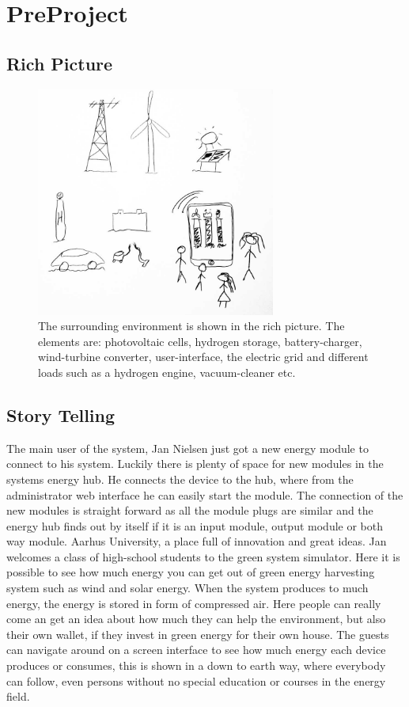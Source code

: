 \chapter{PreProject}
\section{Rich Picture}

\begin{figure}[H]
 \begin{centering}
  \includegraphics[width=0.7\textwidth]{images/rich_picture1.png}
   \caption{The surrounding environment is shown in the rich picture. The
 			 elements are: photovoltaic cells, hydrogen storage, battery-charger, wind-turbine
 			 converter, user-interface, the electric grid and different loads such as a
 			 hydrogen engine, vacuum-cleaner etc. }
 \end{centering}
\end{figure}

\section{Story Telling}
The main user of the system, Jan Nielsen just got a new energy module to connect to his system. Luckily there is plenty of space
for new modules in the systems energy hub. He connects the device to the hub, where from the administrator web interface he can easily start the module.
The connection of the new modules is straight forward as all the module plugs are similar and the energy hub finds out by itself
if it is an input module, output module or both way module.
\newline
Aarhus University, a place full of innovation and great ideas. Jan welcomes a class of high-school students to the green system simulator. Here it
is possible to see how much energy you can get out of green energy harvesting system
such as wind and solar energy. When the system produces to much energy, the 
energy is stored in form of compressed air. Here people can really come an get an idea about 
how much they can help the environment, but also their own wallet, if they invest in green energy for their own house.
The guests can navigate around on a screen interface to see how much energy each device 
produces or consumes, this is shown in a down to earth way, where everybody can follow, 
even persons without no special education or courses in the energy field.

